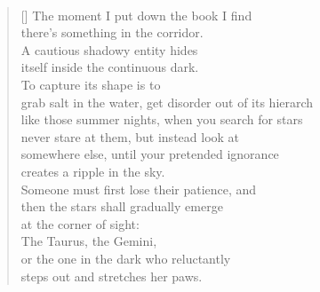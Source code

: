 \documentclass{book}
\begin{document}
\newpage
\poemtitle{\textcolor[RGB]{165,15,15}{How star gazers see through the dark}}
\hspace*{\fill} \\
\settowidth{\versewidth}{grab salt in the water, get disorder out of its hierarch}
\begin{verse}[\versewidth]
    The moment I put down the book I find\\
    there's something in the corridor.\\
    A cautious shadowy entity hides\\
    itself inside the continuous dark.\\
    To capture its shape is to\\
    grab salt in the water, get disorder out of its hierarch\\
    like those summer nights, when you search for stars\\
    never stare at them, but instead look at \\
    somewhere else, until your pretended ignorance\\
    creates a ripple in the sky. \\
    Someone must first lose their patience, and\\
    then the stars shall gradually emerge\\
    at the corner of sight:\\
    The Taurus, the Gemini,\\
    or the one in the dark who reluctantly\\
    steps out and stretches her paws. 
\end{verse}
\end{document}
